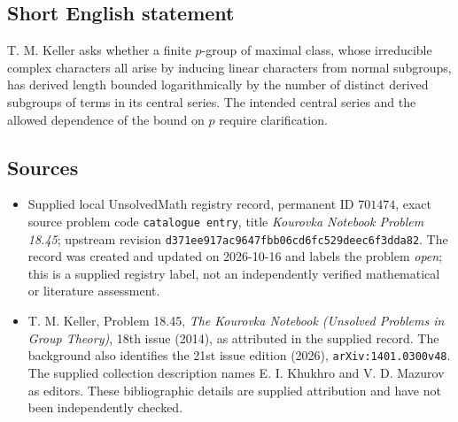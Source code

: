 \documentclass[11pt]{article}
\begin{document}
\subsection{Short English statement}
T. M. Keller asks whether a finite \(p\)-group of maximal class, whose irreducible complex characters all arise by inducing linear characters from normal subgroups, has derived length bounded logarithmically by the number of distinct derived subgroups of terms in its central series. The intended central series and the allowed dependence of the bound on \(p\) require clarification.
\subsection{Sources}
\begin{itemize}
\item Supplied local UnsolvedMath registry record, permanent ID \(701474\), exact source problem code \texttt{catalogue entry}, title \emph{Kourovka Notebook Problem 18.45}; upstream revision \texttt{d371ee917ac9647fbb06cd6fc529deec6f3dda82}. The record was created and updated on 2026-10-16 and labels the problem \emph{open}; this is a supplied registry label, not an independently verified mathematical or literature assessment.
\item T. M. Keller, Problem 18.45, \emph{The Kourovka Notebook (Unsolved Problems in Group Theory)}, 18th issue (2014), as attributed in the supplied record. The background also identifies the 21st issue edition (2026), \texttt{arXiv:1401.0300v48}. The supplied collection description names E. I. Khukhro and V. D. Mazurov as editors. These bibliographic details are supplied attribution and have not been independently checked.
\end{itemize}
\end{document}
